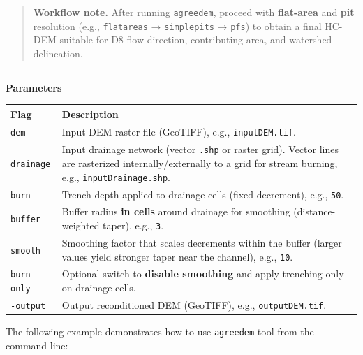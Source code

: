 \documentclass[
]{book}
\theoremstyle{definition}
\theoremstyle{definition}
\theoremstyle{definition}
\theoremstyle{definition}
\theoremstyle{remark}
\begin{document}
\begin{quote}
\textbf{Workflow note.} After running \texttt{agreedem}, proceed with \textbf{flat-area} and \textbf{pit} resolution (e.g., \texttt{flatareas} → \texttt{simplepits} → \texttt{pfs}) to obtain a final HC-DEM suitable for D8 flow direction, contributing area, and watershed delineation.
\end{quote}

\begin{center}\rule{0.5\linewidth}{0.5pt}\end{center}

\textbf{Parameters}

\begin{longtable}[]{@{}
  >{\raggedright\arraybackslash}p{}
  >{\raggedright\arraybackslash}p{}@{}}
\toprule\noalign{}
\begin{minipage}[b]{\linewidth}\raggedright
Flag
\end{minipage} & \begin{minipage}[b]{\linewidth}\raggedright
Description
\end{minipage} \\
\midrule\noalign{}
\endhead
\bottomrule\noalign{}
\endlastfoot
\texttt{dem} & Input DEM raster file (GeoTIFF), e.g., \texttt{inputDEM.tif}. \\
\texttt{drainage} & Input drainage network (vector \texttt{.shp} or raster grid). Vector lines are rasterized internally/externally to a grid for stream burning, e.g., \texttt{inputDrainage.shp}. \\
\texttt{burn} & Trench depth applied to drainage cells (fixed decrement), e.g., \texttt{50}. \\
\texttt{buffer} & Buffer radius \textbf{in cells} around drainage for smoothing (distance-weighted taper), e.g., \texttt{3}. \\
\texttt{smooth} & Smoothing factor that scales decrements within the buffer (larger values yield stronger taper near the channel), e.g., \texttt{10}. \\
\texttt{burn-only} & Optional switch to \textbf{disable smoothing} and apply trenching only on drainage cells. \\
\texttt{-output} & Output reconditioned DEM (GeoTIFF), e.g., \texttt{outputDEM.tif}. \\
\end{longtable}

The following example demonstrates how to use \texttt{agreedem} tool from the command line:
\end{document}
